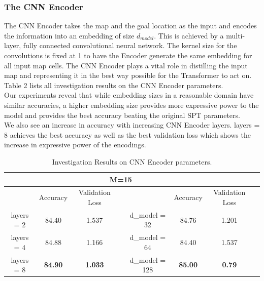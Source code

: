 \subsubsection{The CNN Encoder}
The CNN Encoder takes the map and the goal location as the input and encodes the information into an embedding of size $d_{model}$. This is achieved by a multi-layer, fully connected convolutional neural network. The kernel size for the convolutions is fixed at 1 to have the Encoder generate the same embedding for all input map cells. The CNN Encoder plays a vital role in distilling the input map and representing it in the best way possible for the Transformer to act on. Table 2 lists all investigation results on the CNN Encoder parameters.\\ 
Our experiments reveal that while embedding sizes in a reasonable domain have similar accuracies, a higher embedding size provides more expressive power to the model and provides the best accuracy beating the original SPT parameters.\\ 
We also see an increase in accuracy with increasing CNN Encoder layers. layers = 8 achieves the best accuracy as well as the best validation loss which shows the increase in expressive power of the encodings.
\begin{table}[]
\begin{center}
\begin{tabular}{@{}cccccccc@{}}
\toprule
           &          & \multicolumn{3}{c}{M=15}            &                &                 &  \\ \midrule
           & Accuracy & Validation Loss &  &                & Accuracy       & Validation Loss &  \\ \cmidrule(r){1-3} \cmidrule(l){5-8} 
layers = 2 & 84.40    & 1.537           &  & d\_model = 32  & 84.76          & 1.201           &  \\
layers = 4 & 84.88    & 1.166           &  & d\_model = 64  & 84.40          & 1.537           &  \\
layers = 8 & \textbf{84.90}    & \textbf{1.033}           &  & d\_model = 128 & \textbf{85.00} & \textbf{0.79}   &  \\ \bottomrule
\end{tabular}
\end{center}
\caption{Investigation Results on CNN Encoder parameters.}
\end{table}

